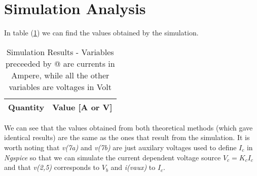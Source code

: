 \section{Simulation Analysis}
\label{sec:simulation}

In table (\ref{tab:sim}) we can find the values obtained by the simulation.

\begin{table}[hbt!]
    \centering
    \begin{tabular}{|l|r|}
    \hline    
    {\bf Quantity} & {\bf Value [A or V]} \\ \hline
    
    \end{tabular}
    \caption{Simulation Results - Variables preceeded by @ are currents in Ampere, while 
    all the other variables are voltages in Volt}
    \label{tab:sim}
\end{table} 

We can see that the values obtained from both theoretical 
methods (which gave identical results) are the same as the ones that result from the simulation.
It is worth noting that \emph{v(7a)} and \emph{v(7b)} are just auxilary voltages used to define $I_c$
in \emph{Ngspice} so that we can simulate the current dependent voltage source $V_c = K_c I_c$ and that
\emph{v(2,5)} corresponds to $V_b$ and \emph{i(vaux)} to $I_c$.